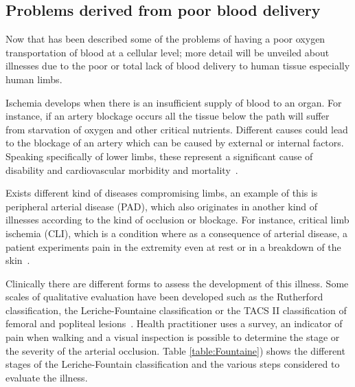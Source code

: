 \subsection{Problems derived from poor blood delivery} %
\label{section literature 3}
Now that has been described some of the problems of having a poor oxygen transportation of blood at a cellular level; more detail will be unveiled about illnesses due to the poor or total lack of blood delivery to human tissue especially human limbs. 

Ischemia develops when there is an insufficient supply of blood to an organ. For instance, if an artery blockage occurs all the tissue below the path will suffer from starvation of oxygen and other critical nutrients. Different causes could lead to the blockage of an artery which can be caused by external or internal factors. Speaking specifically of lower limbs, these represent a significant cause of disability and cardiovascular morbidity and mortality~\cite{novo1995patients}. 

Exists different kind of diseases compromising limbs, an example of this is peripheral arterial disease (PAD), which also originates in another kind of illnesses according to the kind of occlusion or blockage. For instance, critical limb ischemia (CLI), which is a condition where as a consequence of arterial disease, a patient experiments pain in the extremity even at rest or in a breakdown of the skin~\cite{novo2004critical}. 

Clinically there are different forms to assess the development of this illness. Some scales of qualitative evaluation have been developed such as the Rutherford classification, the Leriche-Fountaine classification or the TACS II classification of femoral and popliteal lesions~\cite{norgren2007inter}. Health practitioner uses a survey, an indicator of pain when walking and a visual inspection is possible to determine the stage or the severity of the arterial occlusion.  Table \ref{table:Fountaine}) shows the different stages of the Leriche-Fountain classification and the various steps considered to evaluate the illness.

